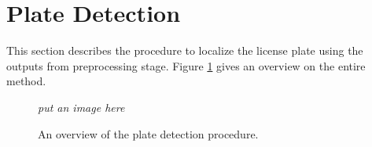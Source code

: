 \documentclass{standalone}
\begin{document}
\section{Plate Detection}
This section describes the procedure to localize the license plate using the outputs from preprocessing stage. Figure \ref{fig:DetectionMethod} gives an overview on the entire method. 

\begin{figure} 
	\centering    
	{\it put an image here }
	\caption{An overview of the plate detection procedure.} 
	\label{fig:DetectionMethod}
\end{figure}
\end{document}
